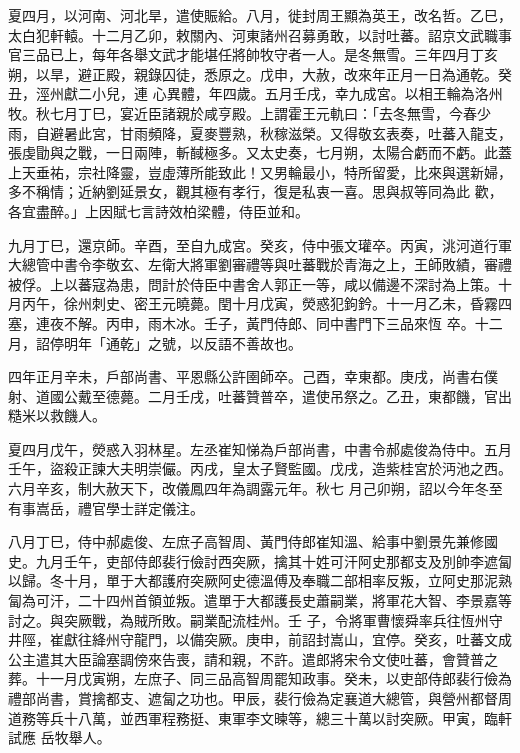 \begin{pinyinscope}
 夏四月，以河南、河北旱，遣使賑給。八月，徙封周王顯為英王，改名哲。乙巳，太白犯軒轅。十二月乙卯，敕關內、河東諸州召募勇敢，以討吐蕃。詔京文武職事官三品已上，每年各舉文武才能堪任將帥牧守者一人。是冬無雪。三年四月丁亥朔，以旱，避正殿，親錄囚徒，悉原之。戊申，大赦，改來年正月一日為通乾。癸丑，涇州獻二小兒，連
 心異體，年四歲。五月壬戌，幸九成宮。以相王輪為洛州牧。秋七月丁巳，宴近臣諸親於咸亨殿。上謂霍王元軌曰：「去冬無雪，今春少雨，自避暑此宮，甘雨頻降，夏麥豐熟，秋稼滋榮。又得敬玄表奏，吐蕃入龍支，張虔勖與之戰，一日兩陣，斬馘極多。又太史奏，七月朔，太陽合虧而不虧。此蓋上天垂祐，宗社降靈，豈虛薄所能致此！又男輪最小，特所留愛，比來與選新婦，多不稱情；近納劉延景女，觀其極有孝行，復是私衷一喜。思與叔等同為此
 歡，各宜盡醉。」上因賦七言詩效柏梁體，侍臣並和。



 九月丁巳，還京師。辛酉，至自九成宮。癸亥，侍中張文瓘卒。丙寅，洮河道行軍大總管中書令李敬玄、左衛大將軍劉審禮等與吐蕃戰於青海之上，王師敗績，審禮被俘。上以蕃寇為患，問計於侍臣中書舍人郭正一等，咸以備邊不深討為上策。十月丙午，徐州刺史、密王元曉薨。閏十月戊寅，熒惑犯鉤鈐。十一月乙未，昏霧四塞，連夜不解。丙申，雨木冰。壬子，黃門侍郎、同中書門下三品來恆
 卒。十二月，詔停明年「通乾」之號，以反語不善故也。



 四年正月辛未，戶部尚書、平恩縣公許圉師卒。己酉，幸東都。庚戌，尚書右僕射、道國公戴至德薨。二月壬戌，吐蕃贊普卒，遣使吊祭之。乙丑，東都饑，官出糙米以救饑人。



 夏四月戊午，熒惑入羽林星。左丞崔知悌為戶部尚書，中書令郝處俊為侍中。五月壬午，盜殺正諫大夫明崇儼。丙戌，皇太子賢監國。戊戌，造紫桂宮於沔池之西。六月辛亥，制大赦天下，改儀鳳四年為調露元年。秋七
 月己卯朔，詔以今年冬至有事嵩岳，禮官學士詳定儀注。



 八月丁巳，侍中郝處俊、左庶子高智周、黃門侍郎崔知溫、給事中劉景先兼修國史。九月壬午，吏部侍郎裴行儉討西突厥，擒其十姓可汗阿史那都支及別帥李遮匐以歸。冬十月，單于大都護府突厥阿史德溫傅及奉職二部相率反叛，立阿史那泥熟匐為可汗，二十四州首領並叛。遣單于大都護長史蕭嗣業，將軍花大智、李景嘉等討之。與突厥戰，為賊所敗。嗣業配流桂州。壬
 子，令將軍曹懷舜率兵往恆州守井陘，崔獻往絳州守龍門，以備突厥。庚申，前詔封嵩山，宜停。癸亥，吐蕃文成公主遣其大臣論塞調傍來告喪，請和親，不許。遣郎將宋令文使吐蕃，會贊普之葬。十一月戊寅朔，左庶子、同三品高智周罷知政事。癸未，以吏部侍郎裴行儉為禮部尚書，賞擒都支、遮匐之功也。甲辰，裴行儉為定襄道大總管，與營州都督周道務等兵十八萬，並西軍程務挺、東軍李文暕等，總三十萬以討突厥。甲寅，臨軒試應
 岳牧舉人。




\end{pinyinscope}
